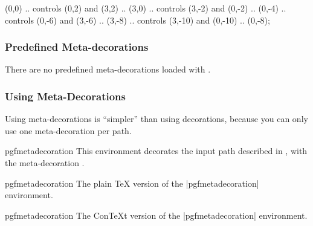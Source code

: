 \begin{command}{\pgfdeclaremetadecorate{}}
\begin{codeexample}[]

\tikz\draw[decorate,decoration={arrows,meta-segment length=2cm}]
  (0,0) .. controls (0,2)   and (3,2)   .. (3,0)
        .. controls (3,-2)  and (0,-2)  .. (0,-4)
        .. controls (0,-6)  and (3,-6)  .. (3,-8)
        .. controls (3,-10) and (0,-10) .. (0,-8);
\end{codeexample}

\end{command}


\subsubsection{Predefined Meta-decorations}

There are no predefined meta-decorations loaded with \pgfname{}.


\subsubsection{Using Meta-Decorations}

Using meta-decorations is ``simpler'' than using decorations, because
you can only use one meta-decoration per path.

\begin{environment}{{pgfmetadecoration}}
  This environment decorates the input path described in
  , with the	meta-decoration .
\end{environment}

\begin{plainenvironment}{{pgfmetadecoration}}
  The plain \TeX{} version of the |{pgfmetadecoration}| environment.
\end{plainenvironment}

\begin{contextenvironment}{{pgfmetadecoration}}
  The Con\TeX t version of the |{pgfmetadecoration}| environment.
\end{contextenvironment}
